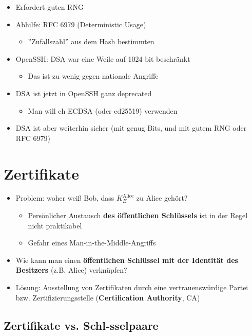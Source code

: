 \documentclass[openany]{book}
\begin{document}
\begin{itemize}
    \item Erfordert guten RNG
    \item Abhilfe: RFC 6979 (Deterministic Usage)
    \begin{itemize}
        \item ''Zufallszahl'' aus dem Hash bestimmten
    \end{itemize}
    \item OpenSSH: DSA war eine Weile auf 1024 bit beschränkt
    \begin{itemize}
        \item Das ist zu wenig gegen nationale Angriffe
    \end{itemize}
    \item DSA ist jetzt in OpenSSH ganz deprecated
    \begin{itemize}
        \item Man will eh ECDSA (oder ed25519) verwenden
    \end{itemize}
    \item DSA ist aber weiterhin sicher (mit genug Bits, und mit gutem RNG oder RFC 6979)
\end{itemize}

\section{Zertifikate}

\begin{itemize}
    \item Problem: woher weiß Bob, dass $K_E^{\text{Alice}}$ zu Alice gehört?
    \begin{itemize}
        \item Persönlicher Austausch \textbf{des öffentlichen Schlüssels} ist in der Regel nicht praktikabel
        \item Gefahr eines Man-in-the-Middle-Angriffs
    \end{itemize}
    \item Wie kann man einen \textbf{öffentlichen Schlüssel mit der Identität des Besitzers} (z.B. Alice) verknüpfen?
    \item Lösung: Ausstellung von Zertifikaten durch eine vertrauenswürdige Partei bzw. Zertifizierungsstelle (\textbf{Certification Authority}, CA) 
\end{itemize}

\subsection{Zertifikate vs. Schl-sselpaare}
\end{document}
